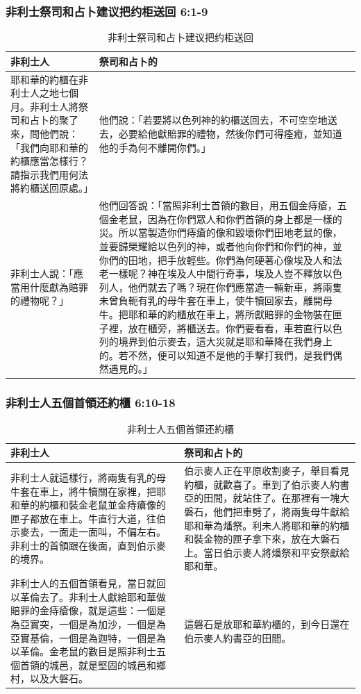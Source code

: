 \subsubsection{非利士祭司和占卜建议把约柜送回 6:1-9}
\begin{table}[H]
\centering 
\begin{tabular}{p{6.2cm}|p{10.8cm}}\hline\hline
非利士人&祭司和占卜的\\\hline
耶和華的約櫃在非利士人之地七個月。非利士人將祭司和占卜的聚了來，問他們說：「我們向耶和華的約櫃應當怎樣行？請指示我們用何法將約櫃送回原處。」
&他們說：「若要將以色列神的約櫃送回去，不可空空地送去，必要給他獻賠罪的禮物，然後你們可得痊癒，並知道他的手為何不離開你們。」\\\hline
非利士人說：「應當用什麼獻為賠罪的禮物呢？」&他們回答說：「當照非利士首領的數目，用五個金痔瘡，五個金老鼠，因為在你們眾人和你們首領的身上都是一樣的災。所以當製造你們痔瘡的像和毀壞你們田地老鼠的像，並要歸榮耀給以色列的神，或者他向你們和你們的神，並你們的田地，把手放輕些。你們為何硬著心像埃及人和法老一樣呢？神在埃及人中間行奇事，埃及人豈不釋放以色列人，他們就去了嗎？現在你們應當造一輛新車，將兩隻未曾負軛有乳的母牛套在車上，使牛犢回家去，離開母牛。把耶和華的約櫃放在車上，將所獻賠罪的金物裝在匣子裡，放在櫃旁，將櫃送去。你們要看看，車若直行以色列的境界到伯示麥去，這大災就是耶和華降在我們身上的。若不然，便可以知道不是他的手擊打我們，是我們偶然遇見的。」\\\hline
\end{tabular}
\caption{非利士祭司和占卜建议把约柜送回}
\end{table}


\subsubsection{非利士人五個首領还約櫃 6:10-18}
\begin{table}[H]
\centering 
\begin{tabular}{p{8.5cm}|p{8.5cm}}\hline\hline
非利士人&祭司和占卜的\\\hline
非利士人就這樣行，將兩隻有乳的母牛套在車上，將牛犢關在家裡，把耶和華的約櫃和裝金老鼠並金痔瘡像的匣子都放在車上。牛直行大道，往伯示麥去，一面走一面叫，不偏左右。非利士的首領跟在後面，直到伯示麥的境界。
&伯示麥人正在平原收割麥子，舉目看見約櫃，就歡喜了。車到了伯示麥人約書亞的田間，就站住了。在那裡有一塊大磐石，他們把車劈了，將兩隻母牛獻給耶和華為燔祭。利未人將耶和華的約櫃和裝金物的匣子拿下來，放在大磐石上。當日伯示麥人將燔祭和平安祭獻給耶和華。\\\hline
非利士人的五個首領看見，當日就回以革倫去了。非利士人獻給耶和華做賠罪的金痔瘡像，就是這些：一個是為亞實突，一個是為加沙，一個是為亞實基倫，一個是為迦特，一個是為以革倫。金老鼠的數目是照非利士五個首領的城邑，就是堅固的城邑和鄉村，以及大磐石。
&這磐石是放耶和華約櫃的，到今日還在伯示麥人約書亞的田間。\\\hline
\end{tabular}
\caption{非利士人五個首領还約櫃}
\end{table}


